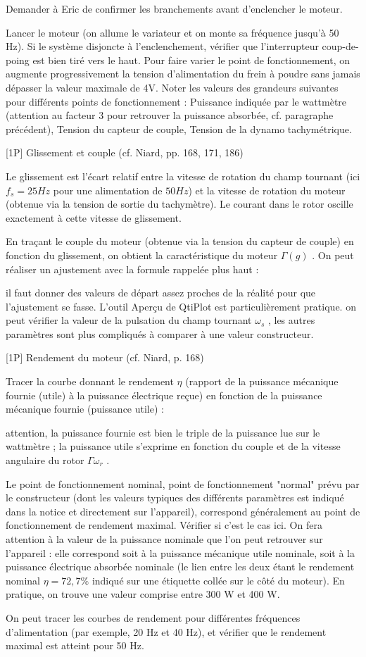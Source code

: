 \documentclass{article}%
\begin{document}
Demander à Eric de confirmer les branchements avant d'enclencher le moteur.

    Lancer le moteur (on allume le variateur et on monte sa fréquence jusqu'à 50 Hz). Si le système disjoncte à l'enclenchement, vérifier que l'interrupteur coup-de-poing est bien tiré vers le haut.
    Pour faire varier le point de fonctionnement, on augmente progressivement la tension d'alimentation du frein à poudre sans jamais dépasser la valeur maximale de 4V.
    Noter les valeurs des grandeurs suivantes pour différents points de fonctionnement : Puissance indiquée par le wattmètre (attention au facteur 3 pour retrouver la puissance absorbée, cf. paragraphe précédent), Tension du capteur de couple, Tension de la dynamo tachymétrique.

[1P] Glissement et couple (cf. Niard, pp. 168, 171, 186)

Le glissement est l'écart relatif entre la vitesse de rotation du champ tournant (ici $f_s = 25 Hz$ pour une alimentation de $50 Hz$) et la vitesse de rotation du moteur (obtenue via la tension de sortie du tachymètre). Le courant dans le rotor oscille exactement à cette vitesse de glissement.

En traçant le couple du moteur (obtenue via la tension du capteur de couple) en fonction du glissement, on obtient la caractéristique du moteur $\Gamma(g)$ . On peut réaliser un ajustement avec la formule rappelée plus haut :

    il faut donner des valeurs de départ assez proches de la réalité pour que l'ajustement se fasse. L'outil Aperçu de QtiPlot est particulièrement pratique.
    on peut vérifier la valeur de la pulsation du champ tournant $\omega_s$ , les autres paramètres sont plus compliqués à comparer à une valeur constructeur.

[1P] Rendement du moteur (cf. Niard, p. 168)

Tracer la courbe donnant le rendement $\eta$ (rapport de la puissance mécanique fournie (utile) à la puissance électrique reçue) en fonction de la puissance mécanique fournie (puissance utile) :

    attention, la puissance fournie est bien le triple de la puissance lue sur le wattmètre ;
    la puissance utile s'exprime en fonction du couple et de la vitesse angulaire du rotor $\Gamma \omega_r$ .

Le point de fonctionnement nominal, point de fonctionnement "normal" prévu par le constructeur (dont les valeurs typiques des différents paramètres est indiqué dans la notice et directement sur l'appareil), correspond généralement au point de fonctionnement de rendement maximal. Vérifier si c'est le cas ici. On fera attention à la valeur de la puissance nominale que l'on peut retrouver sur l'appareil : elle correspond soit à la puissance mécanique utile nominale, soit à la puissance électrique absorbée nominale (le lien entre les deux étant le rendement nominal $\eta = 72,7 \%$ indiqué sur une étiquette collée sur le côté du moteur). En pratique, on trouve une valeur comprise entre 300 W et 400 W.

On peut tracer les courbes de rendement pour différentes fréquences d'alimentation (par exemple, 20 Hz et 40 Hz), et vérifier que le rendement maximal est atteint pour 50 Hz.
\end{document}
